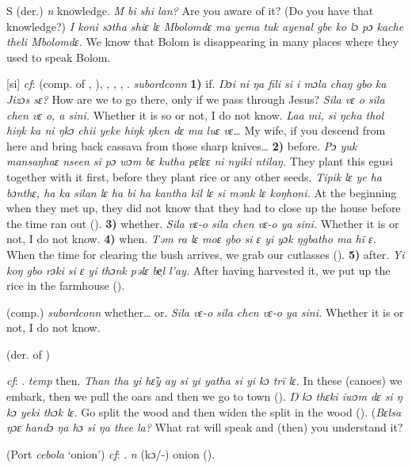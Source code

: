 \begin{letter}{S}
 (der.) \textit{n} knowledge. \textit{M bi shi lan?} Are you aware of it? (Do you have that knowledge?) \textit{I koni sɔtha shiɛ lɛ Mbolomdɛ ma yema tuk ayenal gbe ko lɔ pɔ kache theli Mbolomdɛ.} We know that Bolom is disappearing in many places where they used to speak Bolom.

 [si] \textit{cf}:  (comp. of , ), , , , . \textit{subordconn} \textbf{1)} if. \textit{Ŋɔi ni ŋa fili si i mɔla chaŋ gbo ka Jizɔs sɛ?} How are we to go there, only if we pass through Jesus? \textit{Sila vɛ o sila chen vɛ o, a sini.} Whether it is so or not, I do not know. \textit{Laa mi, si ŋcha thol hiŋk ka ni ŋkɔ chii yeke hiŋk ŋken dɛ ma luɛ vɛ…} My wife, if you descend from here and bring back cassava from those sharp knives… \textbf{2)} before. \textit{Pɔ yuk mansaŋhaɛ nseen si pɔ wɔm bɛ kutha pɛlɛɛ ni nyiki ntilaŋ.} They plant this egusi together with it first, before they plant rice or any other seeds. \textit{Tipik lɛ ye ha bɔnthɛ, ha ka silan lɛ ha	bi ha kantha kil lɛ si mənk lɛ koŋhoni.} At the beginning when they met up, they did not know that they had to close up the house before the time ran out (\citealt{Pichl1967}). \textbf{3)} whether. \textit{Sila vɛ-o sila chen vɛ-o ya sini.} Whether it is or not, I do not know. \textbf{4)} when. \textit{Təm ra lɛ moɛ gbo si ɛ yi yɔk ŋgbatho ma hĩ ɛ.} When the time for clearing the bush arrives, we grab our cutlasses (\citealt{Pichl1967}). \textbf{5)} after. \textit{Yi koŋ gbo rɔki si ɛ yi thɔnk pəlɛ be̹l l'ay.} After having harvested it, we put up the rice in the farmhouse (\citealt{Pichl1967}). 

 (comp.) \textit{subordconn} whether… or. \textit{Sila vɛ-o sila chen vɛ-o ya sini.} Whether it is or not, I do not know.

 (der. of ) 

 \textit{cf}: . \textit{temp} then. \textit{Than tha yi hɛ̃y ay si yi yatha si yi kɔ trï lɛ.} In these (canoes) we embark, then we pull the oars and then we go to town (\citealt{Pichl1967}). \textit{Ŋ kɔ thɛki iwɔm dɛ si ŋ kɔ yeki thɔk lɛ.} Go split the wood and then widen the split in the wood (\citealt{Pichl1967}). (\textit{Bɛlsa ŋɔɛ handɔ ŋa hɔ si ŋa thee la?} What rat will speak and (then) you understand it?

 (Port \textit{cebola} ‘onion') \textit{cf}: . \textit{n} (kɔ/-) onion (\citealt{Pichl1967}).


\end{letter}
